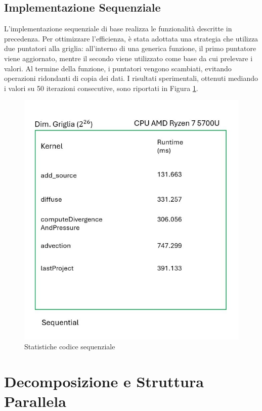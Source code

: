 \documentclass[12pt,a4paper,openany,twoside]{article}
\begin{document}
\subsection{Implementazione Sequenziale}
L'implementazione sequenziale di base realizza le funzionalità descritte in precedenza. Per ottimizzare l'efficienza, è stata adottata una strategia che utilizza due puntatori alla griglia: all'interno di una generica funzione, il primo puntatore viene aggiornato, mentre il secondo viene utilizzato come base da cui prelevare i valori. Al termine della funzione, i puntatori vengono scambiati, evitando operazioni ridondanti di copia dei dati. I risultati sperimentali, ottenuti mediando i valori su 50 iterazioni consecutive, sono riportati in Figura \ref{fig:1}.

\begin{figure}
    \centering
    \includegraphics[width=0.5\linewidth]{Slide1-Mod.jpg}
    \caption{Statistiche codice sequenziale}
    \label{fig:1}
\end{figure}




\section{Decomposizione e Struttura Parallela}
\end{document}
